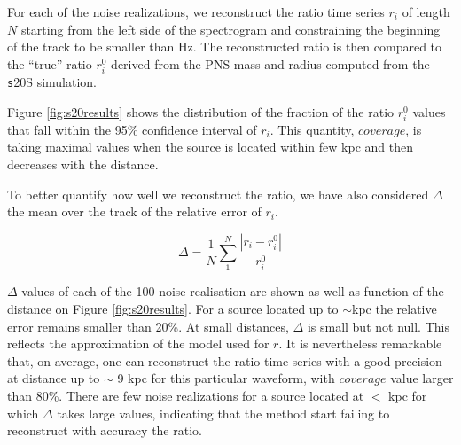For each of the noise realizations, we reconstruct the ratio time series {$r_i$}
of length $N$ starting from the left side of the spectrogram and constraining the beginning of the
track to be smaller than \unit[200]{Hz}. The reconstructed ratio is then compared to the ``true'' ratio
{$r_i^0$} derived from the PNS mass and radius computed from the {\texttt s20S} simulation.

Figure \ref{fig:s20results} shows the distribution of the fraction of the ratio {$r_i^0$} values
that fall within the 95\% confidence interval of {$r_i$}. This quantity, $coverage$, is taking maximal values
when the source is located within few kpc and then decreases with the distance.

To better quantify how well we reconstruct the ratio, we have also considered $\Delta$ the mean
over the track of the relative error of $r_i$. 

\begin{equation}
\Delta=\frac{1}{N}\sum_1^N\frac{|r_i-r_i^0|}{r_i^0}
\end{equation}

$\Delta$ values of each of the 100 noise realisation are shown as well as function of the distance
on Figure \ref{fig:s20results}. For a source located up to $\sim$\unit[9]{kpc} the relative error
remains smaller than 20\%.
At small distances, $\Delta$ is small but not null. This reflects the approximation of the model used for $r$.
It is nevertheless remarkable that, on average, one can reconstruct the ratio time series with a good
precision at distance up to $\sim$ 9 kpc for this particular waveform, with $coverage$ value
larger than 80\%. There are few noise realizations for a source located at $<$ \unit[9]{kpc} for which
$\Delta$ takes large values, indicating that the method start failing to reconstruct with accuracy the ratio.

